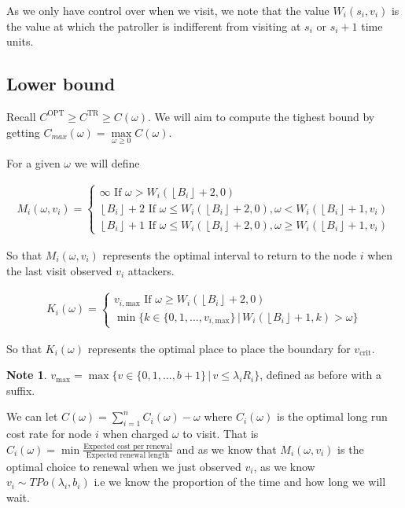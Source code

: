 \documentclass[a4paper,10pt]{article}
\newcommand{\floor}[1]{\left \lfloor #1 \right \rfloor}
\theoremstyle{definition}
\theoremstyle{definition}
\theoremstyle{remark}
\theoremstyle{definition}
\newtheorem*{note}{Note}
\begin{document}
As we only have control over when we visit, we note that the value $W_{i}(s_{i},v_{i})$ is the value at which the patroller is indifferent from visiting at $s_{i}$ or $s_{i}+1$ time units.

\subsection{Lower bound}
Recall $C^{\text{OPT}} \geq C^{\text{TR}} \geq C(\omega)$. We will aim to compute the tighest bound by getting $C_{max}(\omega)=\max\limits_{\omega \geq 0}C(\omega)$.

For a given $\omega$ we will define

\begin{align}
M_{i}(\omega,v_{i})= \begin{cases}
\infty \text{ If } \omega > W_{i}(\floor{B_{i}}+2,0) \\
\floor{B_{i}}+2 \text{ If } \omega \leq W_{i}(\floor{B_{i}}+2,0) , \omega < W_{i}(\floor{B_{i}}+1,v_{i}) \\
\floor{B_{i}}+1 \text{ If } \omega \leq W_{i}(\floor{B_{i}}+2,0) , \omega \geq W_{i}(\floor{B_{i}}+1,v_{i})
\end{cases}
\end{align}

So that $M_{i}(\omega,v_{i})$ represents the optimal interval to return to the node $i$ when the last visit observed $v_{i}$ attackers.

\begin{align}
K_{i}(\omega)= \begin{cases}
v_{i,\text{max}} \text{ If } \omega \geq W_{i}(\floor{B_{i}}+2,0) \\
\min \{ k \in \{ 0,1,...,v_{i,\text{max}} \} \, | \, W_{i}(\floor{B_{i}}+1,k) > \omega \}  
\end{cases}
\end{align}

So that $K_{i}(\omega)$ represents the optimal place to place the boundary for $v_{\text{crit}}$.

\begin{note}
$v_{\text{max}}= \max \{ v \in \{0,1,...,b+1 \} \, | \, v \leq \lambda_{i} R_{i} \}$, defined as before with a suffix.
\end{note}

We can let $C(\omega)=\sum\limits_{i=1}^{n} C_{i}(\omega) -\omega$ where $C_{i}(\omega)$ is the optimal long run cost rate for node $i$ when charged $\omega$ to visit. That is $C_{i}(\omega)=\min \frac{\text{Expected cost per renewal}}{\text{Expected renewal length}}$ and as we know that $M_{i}(\omega,v_{i})$ is the optimal choice to renewal when we just observed $v_{i}$, as we know $v_{i} \sim TPo(\lambda_{i},b_{i})$ i.e we know the proportion of the time and how long we will wait.
\end{document}

